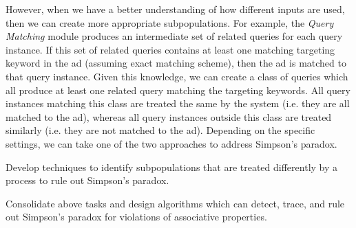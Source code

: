 \documentclass[10pt, onecolumn]{report}
\begin{document}
However, when we have a better understanding of how different inputs are used, 
then we can create more appropriate subpopulations. For example, the \emph{Query
Matching} module produces an intermediate set of related 
queries for each query instance. If this set of related queries contains at least one matching 
targeting keyword in the ad (assuming exact matching scheme), then the ad
is matched to that query instance. Given this knowledge, we can create a class of queries
which all produce at least one related query matching the targeting keywords. 
All query instances matching this class are treated the same by the system (i.e. they 
are all matched to the ad), whereas all query instances outside this class are treated
similarly (i.e. they are not matched to the ad). 
Depending on the specific settings, we 
can take one of the two approaches to address Simpson's paradox. 

\begin{task}\label{task:simpson}
Develop techniques to identify subpopulations that are treated differently by a process
to rule out Simpson's paradox.
\end{task}

\begin{task}\label{task:algo}
Consolidate above tasks and design algorithms
which can detect, trace, and rule out Simpson's paradox
for violations of associative properties. 
\end{task}

%
\end{document}
